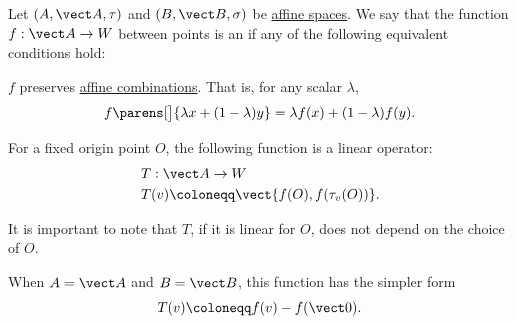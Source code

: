 \begin{definition}\label{def:affine_operator}
  Let \( (A, \vect A, \tau) \) and \( (B, \vect B, \sigma) \) be \hyperref[def:affine_space]{affine spaces}. We say that the function \( {f: \vect A \to W} \) between points is an  if any of the following equivalent conditions hold:
  \begin{thmenum}
     \( f \) preserves \hyperref[def:affine_hull]{affine combinations}. That is, for any scalar \( \lambda \),
    \begin{equation}\label{eq:def:affine_operator/combination}
      f\parens[\big]{ \lambda x + (1 - \lambda) y } = \lambda f(x) + (1 - \lambda) f(y).
    \end{equation}

     For a fixed origin point \( O \), the following function is a linear operator:
    \begin{equation}\label{eq:def:affine_operator/translation/general}
      \begin{aligned}
        &T: \vect A \to W \\
        &T(v) \coloneqq \vect{ f(O), f(\tau_v(O)) }.
      \end{aligned}
    \end{equation}

    It is important to note that \( T \), if it is linear for \( O \), does not depend on the choice of \( O \).

    When \( A = \vect A \) and \( B = \vect B \), this function has the simpler form
    \begin{equation}\label{eq:def:affine_operator/translation/natural}
      T(v) \coloneqq f(v) - f(\vect 0).
    \end{equation}
  \end{thmenum}
\end{definition}
